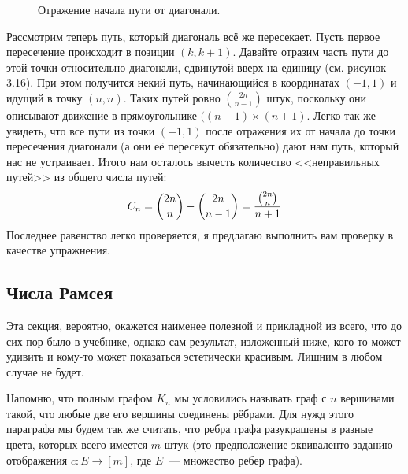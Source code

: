 \begin{figure}[h]
\caption{Отражение начала пути от диагонали.}
\end{figure}

Рассмотрим теперь путь, который диагональ всё же пересекает. Пусть первое пересечение происходит в позиции $(k, k+1)$. Давайте отразим часть пути до этой точки относительно диагонали, сдвинутой вверх на единицу (см. рисунок 3.16). При этом получится некий путь, начинающийся в координатах $(-1, 1)$ и идущий в точку $(n, n)$. Таких путей ровно ${2n\choose n-1}$ штук, поскольку они описывают движение в прямоугольнике $((n-1)\times (n+1)$. Легко так же увидеть, что все пути из точки $(-1, 1)$ после отражения их от начала до точки пересечения диагонали (а они её пересекут обязательно) дают нам путь, который нас не устраивает. Итого нам осталось вычесть количество <<неправильных путей>> из общего числа путей:
$$C_n = {2n\choose n} - {2n\choose n-1} = {{2n\choose n}\over n+1}$$
Последнее равенство легко проверяется, я предлагаю выполнить вам проверку в качестве упражнения.

\subsection{Числа Рамсея}

Эта секция, вероятно, окажется наименее полезной и прикладной из всего, что до сих пор было в учебнике, однако сам результат, изложенный ниже, кого-то может удивить и кому-то может показаться эстетически красивым. Лишним в любом случае не будет.

Напомню, что полным графом $K_n$ мы условились называть граф с $n$ вершинами такой, что любые две его вершины соединены рёбрами. Для нужд этого параграфа мы будем так же считать, что ребра графа разукрашены в разные цвета, которых всего имеется $m$ штук (это предположение эквиваленто заданию отображения $c:E\to[m]$, где $E$~--- множество ребер графа).

